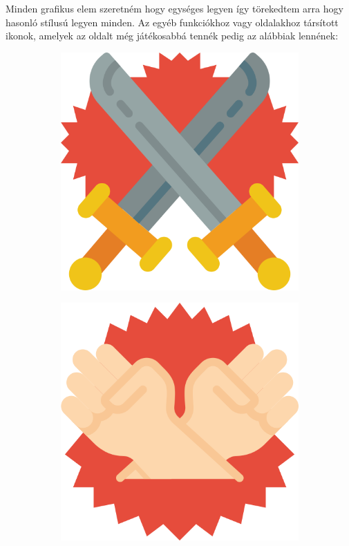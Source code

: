 Minden grafikus elem szeretném hogy egységes legyen így törekedtem arra hogy hasonló stílusú legyen minden. Az egyéb funkciókhoz vagy oldalakhoz társított ikonok, amelyek az oldalt még játékosabbá tennék pedig az alábbiak lennének:

\begin{figure}[h]
    \begin{subfigure}{.1\textwidth}
        \centering
        \includegraphics[width=.8\linewidth]{images/icons/003-swords.png}
    \end{subfigure}
    \begin{subfigure}{.1\textwidth}
        \centering
        \includegraphics[width=.8\linewidth]{images/icons/005-fists.png}

\end{subfigure}
\end{figure}
